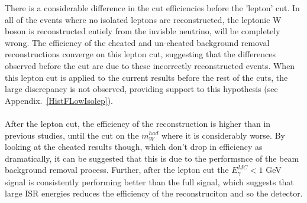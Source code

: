 There is a considerable difference in the cut efficiencies before the 'lepton' cut. In all of the events where no isolated leptons are reconstructed, the leptonic W boson is reconstructed entiely from the invisble neutrino, will be completely wrong. The efficiency of the cheated and un-cheated background removal reconstructions converge on this lepton cut, suggesting that the differences observed before the cut are due to these incorrectly reconstructed events. When this lepton cut is applied to the current results before the rest of the cuts, the large discrepancy is not observed, providing support to this hypothesis (see Appendix.~\ref{HistFLowIsolep}).
\\\\
After the lepton cut, the efficiency of the reconstruction is higher than in previous studies, until the cut on the ${m}_{W}^{had}$ where it is considerably worse. By looking at the cheated results though, which don't drop in efficiency as dramatically, it can be suggested that this is due to the performsnce of the beam background removal process. Further, after the lepton cut the ${E}_{\gamma}^{MC} < 1$ GeV signal is consistently performing better than the full signal, which suggests that large ISR energies reduces the efficiency of the reconstruciton and so the detector.

